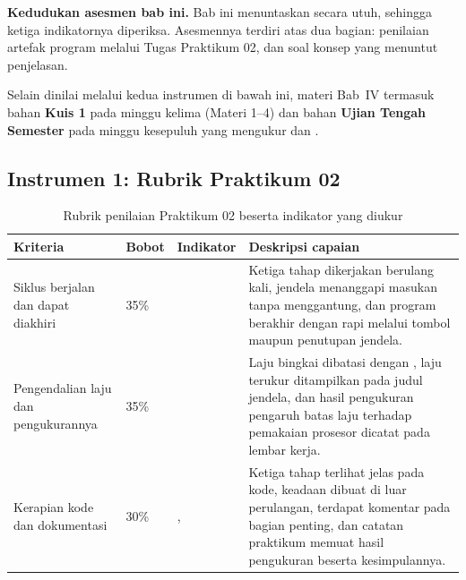 \label{sec:asesmen-game-loop}

\begin{asesmenbox}
\textbf{Kedudukan asesmen bab ini.} Bab ini menuntaskan  secara
utuh, sehingga ketiga indikatornya diperiksa. Asesmennya terdiri atas dua
bagian: penilaian artefak program melalui Tugas Praktikum 02, dan soal konsep
yang menuntut penjelasan.

\vspace{0.4em}
Selain dinilai melalui kedua instrumen di bawah ini, materi Bab~IV termasuk
bahan \textbf{Kuis 1} pada minggu kelima (Materi 1--4) dan bahan
\textbf{Ujian Tengah Semester} pada minggu kesepuluh yang mengukur
 dan .
\end{asesmenbox}

\subsection*{Instrumen 1: Rubrik Praktikum 02}

\begin{table}[htbp]
\centering
\caption{Rubrik penilaian Praktikum 02 beserta indikator yang diukur}
\label{tab:rubrik-praktikum-02}
{\setlength{\tabcolsep}{4pt}\footnotesize%
\begin{tabularx}{\textwidth}{@{}L{3.2cm} C{1.3cm} C{2.1cm} Y@{}}
\toprule
\headrow \textbf{Kriteria} & \textbf{Bobot} & \textbf{Indikator} & \textbf{Deskripsi capaian} \\
\midrule
Siklus berjalan dan dapat diakhiri & 35\% &  &
Ketiga tahap dikerjakan berulang kali, jendela menanggapi masukan tanpa
menggantung, dan program berakhir dengan rapi melalui tombol maupun penutupan
jendela. \\
\addlinespace
Pengendalian laju dan pengukurannya & 35\% &  &
Laju bingkai dibatasi dengan , laju terukur ditampilkan
pada judul jendela, dan hasil pengukuran pengaruh batas laju terhadap
pemakaian prosesor dicatat pada lembar kerja. \\
\addlinespace
Kerapian kode dan dokumentasi & 30\% & ,  &
Ketiga tahap terlihat jelas pada kode, keadaan dibuat di luar perulangan,
terdapat komentar pada bagian penting, dan catatan praktikum memuat hasil
pengukuran beserta kesimpulannya. \\
\bottomrule
\end{tabularx}}
\end{table}

